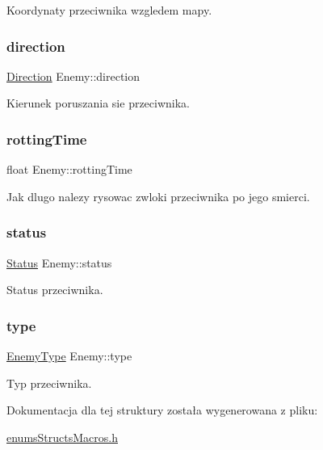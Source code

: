 Koordynaty przeciwnika wzgledem mapy. \mbox{\label{struct_enemy_a7c52f26b7de302092a7fea48496916a7}} 
\subsubsection{\texorpdfstring{direction}{direction}}
{\footnotesize\ttfamily \mbox{\hyperlink{enums_structs_macros_8h_a224b9163917ac32fc95a60d8c1eec3aa}{Direction}} Enemy\+::direction}

Kierunek poruszania sie przeciwnika. \mbox{\label{struct_enemy_ae1fec0d15b3a33d372e918f691b9f3f7}} 
\subsubsection{\texorpdfstring{rotting\+Time}{rottingTime}}
{\footnotesize\ttfamily float Enemy\+::rotting\+Time}

Jak dlugo nalezy rysowac zwloki przeciwnika po jego smierci. \mbox{\label{struct_enemy_af5feea31ac74cfff2cbbfdb149bcf58f}} 
\subsubsection{\texorpdfstring{status}{status}}
{\footnotesize\ttfamily \mbox{\hyperlink{enums_structs_macros_8h_a67a0db04d321a74b7e7fcfd3f1a3f70b}{Status}} Enemy\+::status}

Status przeciwnika. \mbox{\label{struct_enemy_a51791619a70962355568fae00cb96cdb}} 
\subsubsection{\texorpdfstring{type}{type}}
{\footnotesize\ttfamily \mbox{\hyperlink{enums_structs_macros_8h_ac3e413a86119db4b031458c7259e268e}{Enemy\+Type}} Enemy\+::type}

Typ przeciwnika. 

Dokumentacja dla tej struktury została wygenerowana z pliku\+:\begin{DoxyCompactItemize}
\item 
\mbox{\hyperlink{enums_structs_macros_8h}{enums\+Structs\+Macros.\+h}}\end{DoxyCompactItemize}
